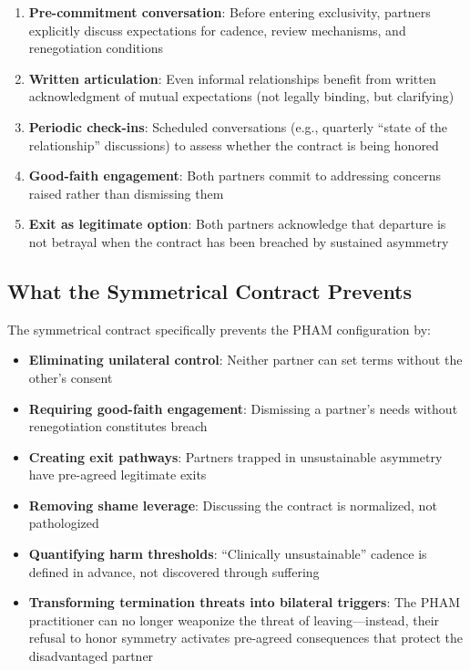 \documentclass[12pt,openany]{book}
\numberwithin{equation}{chapter}
\begin{document}
\begin{enumerate}
    \item \textbf{Pre-commitment conversation}: Before entering exclusivity, partners explicitly discuss expectations for cadence, review mechanisms, and renegotiation conditions
    \item \textbf{Written articulation}: Even informal relationships benefit from written acknowledgment of mutual expectations (not legally binding, but clarifying)
    \item \textbf{Periodic check-ins}: Scheduled conversations (e.g., quarterly ``state of the relationship'' discussions) to assess whether the contract is being honored
    \item \textbf{Good-faith engagement}: Both partners commit to addressing concerns raised rather than dismissing them
    \item \textbf{Exit as legitimate option}: Both partners acknowledge that departure is not betrayal when the contract has been breached by sustained asymmetry
\end{enumerate}

\subsection{What the Symmetrical Contract Prevents}

The symmetrical contract specifically prevents the PHAM configuration by:
\begin{itemize}
    \item \textbf{Eliminating unilateral control}: Neither partner can set terms without the other's consent
    \item \textbf{Requiring good-faith engagement}: Dismissing a partner's needs without renegotiation constitutes breach
    \item \textbf{Creating exit pathways}: Partners trapped in unsustainable asymmetry have pre-agreed legitimate exits
    \item \textbf{Removing shame leverage}: Discussing the contract is normalized, not pathologized
    \item \textbf{Quantifying harm thresholds}: ``Clinically unsustainable'' cadence is defined in advance, not discovered through suffering
    \item \textbf{Transforming termination threats into bilateral triggers}: The PHAM practitioner can no longer weaponize the threat of leaving---instead, their refusal to honor symmetry activates pre-agreed consequences that protect the disadvantaged partner
\end{itemize}
\end{document}
